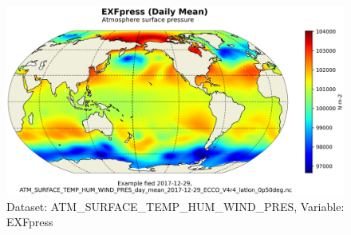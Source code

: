 \begin{figure}[H]
\centering
\includegraphics[scale=0.55]{../images/plots/latlon_plots/Atmosphere_Surface_Temperature_Humidity_Wind_and_Pressure/EXFpress.png}
\caption{Dataset: ATM\_SURFACE\_TEMP\_HUM\_WIND\_PRES, Variable: EXFpress}
\label{tab:table-ATM_SURFACE_TEMP_HUM_WIND_PRES_EXFpress-Plot}
\end{figure}
\pagebreak
